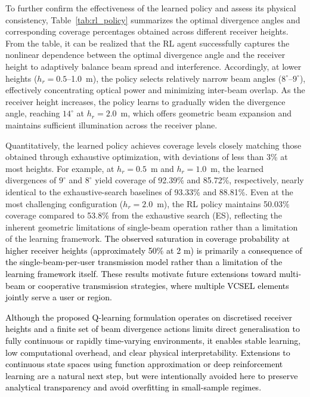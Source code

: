 \documentclass[twocolumn,twoside]{IEEEtran}
\theoremstyle{break}
\begin{document}
To further confirm the effectiveness of the learned policy and assess its physical consistency, Table~\ref{tab:rl_policy} summarizes the optimal divergence angles and corresponding coverage percentages obtained across different receiver heights. From the table, it can be realized that the RL agent successfully captures the nonlinear dependence between the optimal divergence angle and the receiver height to adaptively balance beam spread and interference. Accordingly, at lower heights ($h_r = 0.5$–1.0~m), the policy selects relatively narrow beam angles ($8^{\circ}$–$9^{\circ}$), effectively concentrating optical power and minimizing inter-beam overlap. As the receiver height increases, the policy learns to gradually widen the divergence angle, reaching $14^{\circ}$ at $h_r = 2.0$~m, which offers geometric beam expansion and maintains sufficient illumination across the receiver plane.

Quantitatively, the learned policy achieves coverage levels closely matching those obtained through exhaustive optimization, with deviations of less than 3\% at most heights. For example, at $h_r = 0.5$~m and $h_r = 1.0$~m, the learned divergences of $9^{\circ}$ and $8^{\circ}$ yield coverage of 92.39\% and 85.72\%, respectively, nearly identical to the exhaustive-search baselines of 93.33\% and 88.81\%. Even at the most challenging configuration ($h_r = 2.0$~m), the RL policy maintains 50.03\% coverage compared to 53.8\% from the exhaustive search (ES), reflecting the inherent geometric limitations of single-beam operation rather than a limitation of the learning framework. \textcolor{black}{The observed saturation in coverage probability at higher receiver heights (approximately 50\% at 2 m) is primarily a consequence of the single-beam-per-user transmission model rather than a limitation of the learning framework itself. These results motivate future extensions toward multi-beam or cooperative transmission strategies, where multiple VCSEL elements jointly serve a user or region.}

\textcolor{black}{Although the proposed Q-learning formulation operates on discretised receiver heights and a finite set of beam divergence actions limits direct generalisation to fully continuous or rapidly time-varying environments, it enables stable learning, low computational overhead, and clear physical interpretability. Extensions to continuous state spaces using function approximation or deep reinforcement learning are a natural next step, but were intentionally avoided here to preserve analytical transparency and avoid overfitting in small-sample regimes.}
\end{document}
